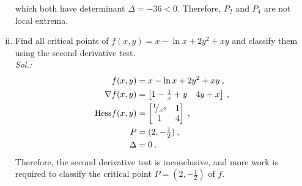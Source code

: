 \begin{example}
\begin{enumerate}[(i)]
	which both have determinant $\Delta = -36 < 0$. Therefore, $P_2$ and $P_4$ are not local extrema.
	\item Find all critical points of 
	$f(x,y) = x - \ln x + 2 y^2 + xy$
	and classify them using the second derivative test.\\
	{\it Sol.:}
	\begin{equation*}
	\begin{split}
	f(x,y) &= x - \ln x + 2 y^2 + xy \:, \\
	\nabla f (x,y) & = \begin{bmatrix} 1 - \tfrac{1}{x} + y & 4y + x \end{bmatrix} \:,\\
	\mathrm{Hess}f(x,y) &= \begin{bmatrix} {}^{1}\!/_{x^2} & 1 \\ 1 & 4 \end{bmatrix} \:,\\
	P &= (2,-\tfrac{1}{2}) \:,\\
	\Delta &= 0 \:.
	\end{split}
	\end{equation*}
	Therefore, the second derivative test is inconclusive, and more work is required to classify the critical point $P=(2,-\tfrac{1}{2})$ of $f$.
\end{enumerate}
\end{example}

